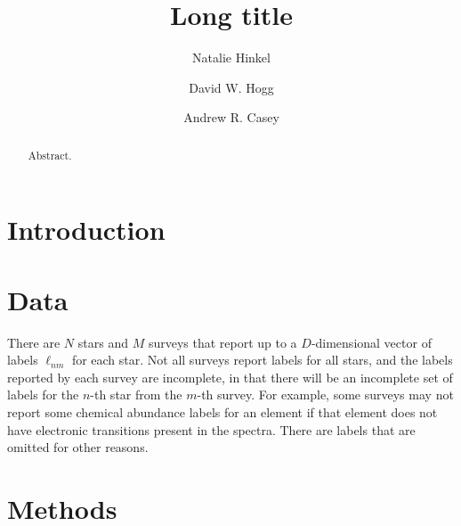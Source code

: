 \documentclass[twocolumn]{aastex61}
\newcommand\labels{\mathcal{\ell}}
\begin{document}
\title{Long title}


\author[0000-0003-0595-5132]{Natalie Hinkel}

\author[0000-0003-2866-9403]{David W. Hogg}

\author[0000-0003-0174-0564]{Andrew R. Casey}


\begin{abstract}
Abstract.
\end{abstract}


\keywords{}

\section{Introduction}
\label{sec:introduction}


\section{Data}
\label{sec:data}

There are $N$ stars and $M$ surveys that report up to a $D$-dimensional vector of
labels $\labels_{nm}$ for each star. Not all surveys report labels for all stars,
and the labels reported by each survey are incomplete, in that there will be an
incomplete set of labels for the $n$-th star from the $m$-th survey. For example,
some surveys may not report some chemical abundance labels for an element if that
element does not have electronic transitions present in the spectra. There are
labels that are omitted for other reasons.


\section{Methods}
\label{sec:methods}
\end{document}
